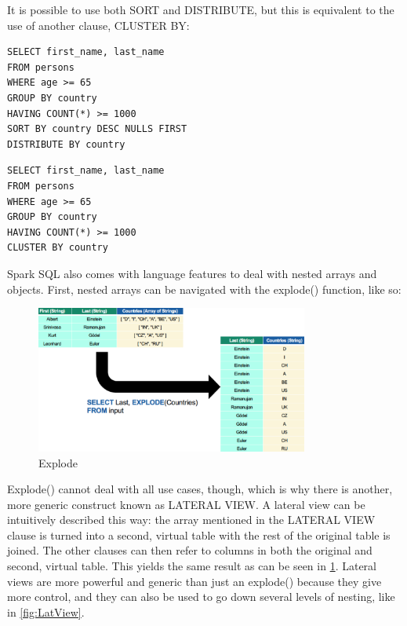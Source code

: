 It is possible to use both SORT and DISTRIBUTE, but this is equivalent to the use of another clause, CLUSTER BY:

\begin{minipage}{0.45\textwidth}
\begin{lstlisting}[style=sql]
SELECT first_name, last_name
FROM persons
WHERE age >= 65
GROUP BY country
HAVING COUNT(*) >= 1000
SORT BY country DESC NULLS FIRST
DISTRIBUTE BY country
\end{lstlisting}
\end{minipage}
\hfill
\begin{minipage}{0.45\textwidth}
\begin{lstlisting}[style=sql]
SELECT first_name, last_name
FROM persons
WHERE age >= 65
GROUP BY country
HAVING COUNT(*) >= 1000
CLUSTER BY country
\end{lstlisting}
\end{minipage}

Spark SQL also comes with language features to deal with nested arrays and objects.
First, nested arrays can be navigated with the explode() function, like so:

\begin{figure}[h]
    \centering
    \includegraphics[width=0.8\textwidth]{Figures/Explode.png}
    \caption{Explode}\label{fig:Explode}
\end{figure}

Explode() cannot deal with all use cases, though, which is why there is another, more generic construct known as LATERAL VIEW. A lateral view can be intuitively described this way: the array mentioned in the LATERAL VIEW clause is turned into a second, virtual table with the rest of the original table is joined. The other clauses can then refer to columns in both the original and second, virtual table. This yields the same result as can be seen in \cref{fig:Explode}.  Lateral views are more powerful and generic than just an explode() because they give more control, and they can also be used to go down several levels of nesting, like in \cref{fig:LatView}.


